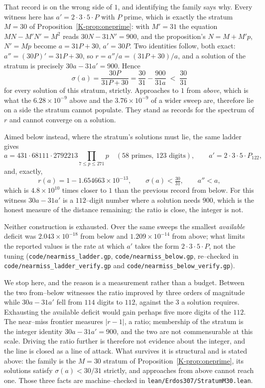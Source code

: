 \documentclass[11pt]{article}
\theoremstyle{definition}
\begin{document}
That record is on the wrong side of $1$, and identifying the family says why. Every witness here has
$a'=2\cdot3\cdot5\cdot P$ with $P$ prime, which is exactly the stratum $M=30$ of
Proposition~\textup{\ref{K-prop:oneprime}}: with $M'=31$ the equation $MN-M'N'=M^2$ reads
$30N-31N'=900$, and the proposition's $N=M+M'p$, $N'=Mp$ become $a=31P+30$, $a'=30P$. Two identities
follow, both exact: $a''=(30P)'=31P+30$, so $r=a''/a=(31P+30)/a$, and a solution of the stratum is
precisely $30a-31a'=900$. Hence
\[ \sigma(a)=\frac{30P}{31P+30}=\frac{30}{31}-\frac{900}{31a}\;<\;\frac{30}{31} \]
for every solution of this stratum, strictly. Approaches to $1$ from \emph{above}, which is what the
$6.28\times10^{-9}$ above and the $3.76\times10^{-9}$ of a wider sweep are, therefore lie on a side
the stratum cannot populate. They stand as records for the spectrum of $r$ and cannot converge on a
solution.

Aimed below instead, where the stratum's solutions must lie, the same ladder gives
\[ a=431\cdot68111\cdot2792213\!\!\prod_{7\le p\le271}\!\!p \quad(58\text{ primes},\ 123\text{ digits}),
   \qquad a'=2\cdot3\cdot5\cdot P_{122}, \]
and, exactly,
\[ r(a)=1-1.654663\times10^{-13},\qquad \sigma(a)<\tfrac{30}{31},\qquad a''<a, \]
which is $4.8\times10^{10}$ times closer to $1$ than the previous record from below. For this witness
$30a-31a'$ is a $112$--digit number where a solution needs $900$, which is the honest measure of the
distance remaining: the ratio is close, the integer is not.

Neither construction is exhausted. Over the same sweeps the smallest \emph{available} deficit was
$2.043\times10^{-18}$ from below and $1.209\times10^{-14}$ from above; what limits the reported values
is the rate at which $a'$ takes the form $2\cdot3\cdot5\cdot P$, not the tuning
\textup{(\texttt{code/nearmiss\_ladder.gp}, \texttt{code/nearmiss\_below.gp}, re--checked in
\texttt{code/nearmiss\_ladder\_verify.gp} and \texttt{code/nearmiss\_below\_verify.gp})}.

We stop here, and the reason is a measurement rather than a budget. Between the two from--below
witnesses the ratio improved by three orders of magnitude while $30a-31a'$ fell from $114$ digits to
$112$, against the $3$ a solution requires. Exhausting the available deficit would gain perhaps five
more digits of the $112$. The near--miss frontier measures $|r-1|$, a ratio; membership of the
stratum is the integer identity $30a-31a'=900$, and the two are not commensurable at this scale.
Driving the ratio further is therefore not evidence about the integer, and the line is closed as a
line of attack. What survives it is structural and is stated above: the family is the $M=30$ stratum
of Proposition~\ref{K-prop:oneprime}, its solutions satisfy $\sigma(a)<30/31$ strictly, and approaches
from above cannot reach one. Those three facts are machine--checked in
\texttt{lean/Erdos307/StratumM30.lean}.
\end{document}
